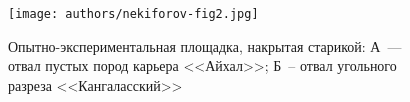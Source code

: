 \begin{figure}
  \begin{center}
    \texttt{[image: authors/nekiforov-fig2.jpg]}
  \end{center}
  \caption{Опытно-экспериментальная площадка, накрытая старикой:
  А~--- отвал пустых пород карьера <<Айхал>>; Б~-- отвал угольного разреза <<Кангаласский>>}
  \label{fig:nekiforov-fig2}
\end{figure}
